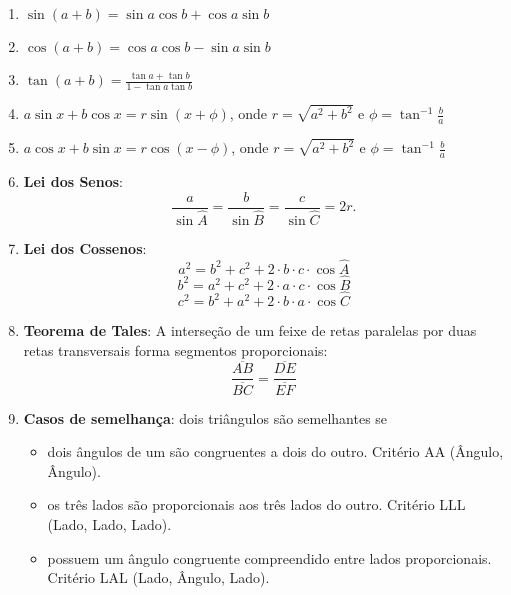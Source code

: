 	\begin{enumerate}
		\item $\sin(a+b) = \sin a \cos b + \cos a \sin b$
		\item $\cos(a+b) = \cos a \cos b - \sin a \sin b$
		\item $\tan(a+b) = \frac{\tan a + \tan b}{1 - \tan a \tan b}$
		\item $a\sin x+b\cos x = r\sin(x+\phi)$, onde $r=\sqrt{a^2+b^2}$ e $\phi = \tan^{-1}\frac{b}{a}$ 
		\item $a\cos x+b\sin x = r\cos(x-\phi)$, onde $r=\sqrt{a^2+b^2}$ e $\phi = \tan^{-1}\frac{b}{a}$
		\item \textbf{Lei dos Senos}: $$\frac{a}{\sin \hat{A}} = \frac{b}{\sin \hat{B}} = \frac{c}{\sin \hat{C}} = 2r.$$
		\item \textbf{Lei dos Cossenos}:
		$$a^2 = b^2 +c^2+2\cdot b\cdot c\cdot\cos\hat{A}$$
		$$b^2 = a^2 +c^2+2\cdot a\cdot c\cdot\cos\hat{B}$$
		$$c^2 = b^2 +a^2+2\cdot b\cdot a\cdot\cos\hat{C}$$
		\item \textbf{Teorema de Tales}: A interseção de um feixe de retas paralelas por duas retas transversais forma segmentos proporcionais:
		$$\frac{\overline{AB}}{\overline{BC}} = \frac{\overline{DE}}{\overline{EF}}$$
		\item \textbf{Casos de semelhança}: dois triângulos são semelhantes se
		\begin{itemize}
			\item dois ângulos de um são congruentes a dois do outro. Critério AA (Ângulo, Ângulo).
			\item os três lados são proporcionais aos três lados do outro. Critério LLL (Lado, Lado, Lado).
			\item possuem um ângulo congruente compreendido entre lados proporcionais. Critério LAL (Lado, Ângulo, Lado).
		\end{itemize}

	\end{enumerate}
